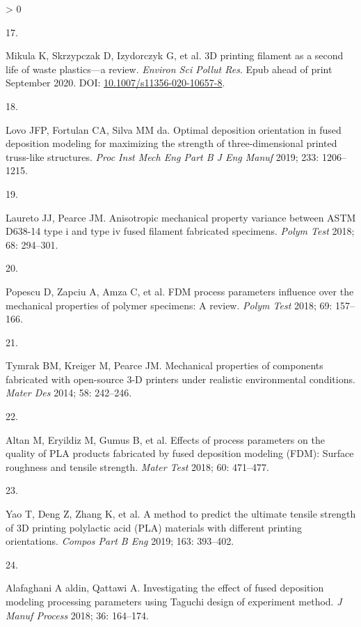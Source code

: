 \documentclass[
  12pt]{article}
\newlength{\cslhangindent}
\newlength{\csllabelwidth}
\newenvironment{CSLReferences}[2] %
 {%
  \setlength{\parindent}{0pt}
  \ifodd #1 \everypar{\setlength{\hangindent}{\cslhangindent}}\ignorespaces\fi
  \ifnum #2 > 0
  \setlength{\parskip}{#2\baselineskip}
  \fi
 }%
 {}
\newcommand{\CSLLeftMargin}[1]{\parbox[t]{\csllabelwidth}{#1}}
\newcommand{\CSLRightInline}[1]{\parbox[t]{\linewidth - \csllabelwidth}{#1}\break}
\begin{document}
\begin{CSLReferences}{0}{0}
\leavevmode\hypertarget{ref-Mikula2020}{}%
\CSLLeftMargin{17. }
\CSLRightInline{Mikula K, Skrzypczak D, Izydorczyk G, et al. {3D printing filament as a second life of waste plastics---a review}. \emph{Environ Sci Pollut Res}. Epub ahead of print September 2020. DOI: \href{https://doi.org/10.1007/s11356-020-10657-8}{10.1007/s11356-020-10657-8}.}

\leavevmode\hypertarget{ref-Lovo2018}{}%
\CSLLeftMargin{18. }
\CSLRightInline{Lovo JFP, Fortulan CA, Silva MM da. {Optimal deposition orientation in fused deposition modeling for maximizing the strength of three-dimensional printed truss-like structures}. \emph{Proc Inst Mech Eng Part B J Eng Manuf} 2019; 233: 1206--1215.}

\leavevmode\hypertarget{ref-Laureto2018}{}%
\CSLLeftMargin{19. }
\CSLRightInline{Laureto JJ, Pearce JM. {Anisotropic mechanical property variance between ASTM D638-14 type i and type iv fused filament fabricated specimens}. \emph{Polym Test} 2018; 68: 294--301.}

\leavevmode\hypertarget{ref-Popescu2018}{}%
\CSLLeftMargin{20. }
\CSLRightInline{Popescu D, Zapciu A, Amza C, et al. {FDM process parameters influence over the mechanical properties of polymer specimens: A review}. \emph{Polym Test} 2018; 69: 157--166.}

\leavevmode\hypertarget{ref-Tymrak2014a}{}%
\CSLLeftMargin{21. }
\CSLRightInline{Tymrak BM, Kreiger M, Pearce JM. {Mechanical properties of components fabricated with open-source 3-D printers under realistic environmental conditions}. \emph{Mater Des} 2014; 58: 242--246.}

\leavevmode\hypertarget{ref-Altan2018}{}%
\CSLLeftMargin{22. }
\CSLRightInline{Altan M, Eryildiz M, Gumus B, et al. {Effects of process parameters on the quality of PLA products fabricated by fused deposition modeling (FDM): Surface roughness and tensile strength}. \emph{Mater Test} 2018; 60: 471--477.}

\leavevmode\hypertarget{ref-Yao2019}{}%
\CSLLeftMargin{23. }
\CSLRightInline{Yao T, Deng Z, Zhang K, et al. {A method to predict the ultimate tensile strength of 3D printing polylactic acid (PLA) materials with different printing orientations}. \emph{Compos Part B Eng} 2019; 163: 393--402.}

\leavevmode\hypertarget{ref-Alafaghani2018}{}%
\CSLLeftMargin{24. }
\CSLRightInline{Alafaghani A aldin, Qattawi A. {Investigating the effect of fused deposition modeling processing parameters using Taguchi design of experiment method}. \emph{J Manuf Process} 2018; 36: 164--174.}


\end{CSLReferences}
\end{document}
